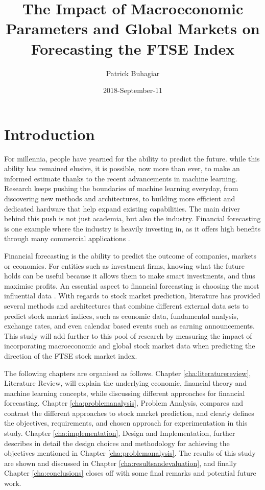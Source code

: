 \documentclass{UoYCSproject}
\author{Patrick Buhagiar}
\title{The Impact of Macroeconomic Parameters and Global Markets on Forecasting the FTSE Index}
\date{2018-September-11}
\begin{document}
\maketitle

\listoffigures
\listoftables

\label{sec:start}
\thispagestyle{empty}\cleardoublepage

\chapter{Introduction}
\label{cha:Introduction}
For millennia, people have yearned for the ability to predict the future. while this ability has remained elusive, it is possible, now more than ever, to make an informed estimate thanks to the recent advancements in machine learning. Research keeps pushing the boundaries of machine learning everyday, from discovering new methods and architectures, to building more efficient and dedicated hardware that help expand existing capabilities. The main driver behind this push is not just academia, but also the industry.  Financial forecasting is one example where the industry is heavily investing in, as it offers high benefits through many commercial applications \cite{majhi2007stock}.

Financial forecasting is the ability to predict the outcome of companies, markets or economies. For entities such as investment firms, knowing what the future holds can be useful because it allows them to make smart investments, and thus maximise profits. An essential aspect to financial forecasting is choosing the most influential data \cite{zhong2017forecasting}. With regards to stock market prediction, literature has provided several methods and architectures that combine different external data sets to predict stock market indices, such as economic data, fundamental analysis, exchange rates, and even calendar based events such as earning announcements. This study will add further to this pool of research by measuring the impact of incorporating macroeconomic and global stock market data when predicting the direction of the FTSE stock market index.   

The following chapters are organised as follows. Chapter \ref{cha:literaturereview}, Literature Review, will explain the underlying economic, financial theory and machine learning concepts, while discussing different approaches for financial forecasting. Chapter \ref{cha:problemanalysis}, Problem Analysis, compares and contrast the different approaches to stock market prediction, and clearly defines the objectives, requirements, and chosen approach for experimentation in this study. Chapter \ref{cha:implementation}, Design and Implementation, further describes in detail the design choices and methodology for achieving the objectives mentioned in Chapter \ref{cha:problemanalysis}. The results of this study are shown and discussed in Chapter \ref{cha:resultsandevaluation}, and finally Chapter \ref{cha:conclusions} closes off with some final remarks and potential future work. 
\end{document}

